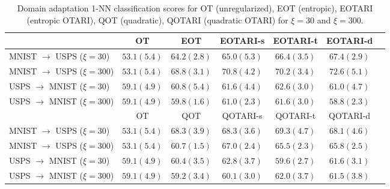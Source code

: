 \begin{table}[h]
    \centering
    \begin{small}
    \begin{tabular}{lc@{\hskip 0.1in}c@{\hskip 0.1in}c@{\hskip 0.1in}c@{\hskip 0.1in}c@{\hskip 0.1in}c}
    \toprule[1.5pt]
    & OT& EOT & EOTARI-s & EOTARI-t & EOTARI-d \\
    \midrule
    MNIST $\to$ USPS ($\xi=30$) & $53.1(5.4)$ & $64.2(2.8)$ & $65.0(5.3)$ & $66.4(3.5)$ & $\mathbf{67.4(2.9)}$ \\
    MNIST $\to$ USPS ($\xi=300$) & $53.1(5.4)$ & $68.8(3.1)$ & $70.8(4.2)$ & $70.2(3.4)$ & $\mathbf{72.6(5.1)}$ \\
  
    USPS $\to$ MNIST ($\xi=30$) & $59.1(4.9)$ & $60.8(5.4)$ & $61.6(4.4)$ & $\mathbf{62.6(3.0)}$ & $61.0(4.7)$ \\
    USPS $\to$ MNIST ($\xi=300$) & $59.1(4.9)$ & $59.8(1.6)$ & $61.0(2.3)$ & $\mathbf{61.6(3.0)}$ & $58.8(2.3)$ \\
    \midrule
    \midrule
    & OT & QOT & QOTARI-s & QOTARI-t & QOTARI-d \\
    \midrule
    MNIST $\to$ USPS ($\xi=30$) & $53.1(5.4)$ & $68.3(3.9)$ & $68.3(3.6)$ & $\mathbf{69.3(4.7)}$ & $68.1(4.6)$ \\
    MNIST $\to$ USPS ($\xi=300$) & $53.1(5.4)$ & $60.7(1.5)$ & $\mathbf{67.0(2.4)}$ & $65.5(2.3)$ & $65.8(2.5)$ \\
    USPS $\to$ MNIST ($\xi=30$) & $59.1(4.9)$ & $60.4(3.5)$ & $\mathbf{62.8(3.7)}$ & $59.6(2.7)$ & $61.6(3.1)$ \\
    USPS $\to$ MNIST ($\xi=300$) & $59.1(4.9)$ & $59.2(3.4)$ & $60.1(3.0)$ & $\mathbf{62.0(3.7)}$ & $61.5(3.8)$ \\
    \bottomrule[1.5pt]
    \end{tabular}
    \end{small}
    \vspace{0.4cm}
    \caption{Domain adaptation 1-NN classification scores for OT (unregularized), EOT (entropic), EOTARI (entropic OTARI), QOT (quadratic), QOTARI (quadratic OTARI) for $\xi=30$ and $\xi=300$.}
    \label{tab:da_exps}
    \vspace{0.1cm}
  \end{table}

